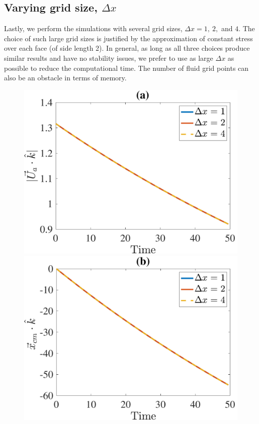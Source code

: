 \subsection{Varying grid size, $\Delta x$}
Lastly, we perform the simulations with several grid sizes, $\Delta x = 1, \ 2, $ and $4$. 
The choice of such large grid sizes is justified by the approximation of constant stress over each face (of side length 2).
In general, as long as all three choices produce similar results and have no stability issues, we prefer to use as large $\Delta x$ as possible to reduce the computational time. 
The number of fluid grid points can also be an obstacle in terms of memory. 
\par
\begin{figure}[ht]
	\begin{center}
		\includegraphics[scale=0.35]{./figures/fig_NC10_dx_Ua3_all}
		\includegraphics[scale=0.35]{./figures/fig_NC10_dx_cm3_all}

\end{center}
\end{figure}
